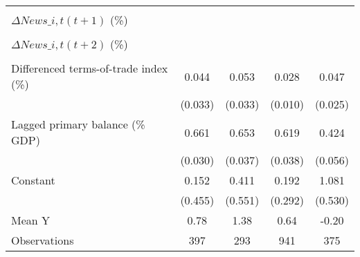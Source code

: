 {\begin{tabular}{l*{4}{c}}
                    &                     &                     &                     &                     \\
\addlinespace
$ \Delta News\_{i,t}(t+1)$ (\%)&                     &                     &                     &                     \\
                    &                     &                     &                     &                     \\
\addlinespace
$ \Delta News\_{i,t}(t+2)$ (\%)&                     &                     &                     &                     \\
                    &                     &                     &                     &                     \\
\addlinespace
Differenced terms-of-trade index (\%)&       0.044         &       0.053         &       0.028\sym{***}&       0.047\sym{*}  \\
                    &     (0.033)         &     (0.033)         &     (0.010)         &     (0.025)         \\
\addlinespace
Lagged primary balance (\% GDP)&       0.661\sym{***}&       0.653\sym{***}&       0.619\sym{***}&       0.424\sym{***}\\
                    &     (0.030)         &     (0.037)         &     (0.038)         &     (0.056)         \\
\addlinespace
Constant            &       0.152         &       0.411         &       0.192         &       1.081\sym{*}  \\
                    &     (0.455)         &     (0.551)         &     (0.292)         &     (0.530)         \\
\midrule
Mean Y              &        0.78         &        1.38         &        0.64         &       -0.20         \\
Observations        &         397         &         293         &         941         &         375         \\
\bottomrule
\end{tabular}
}
